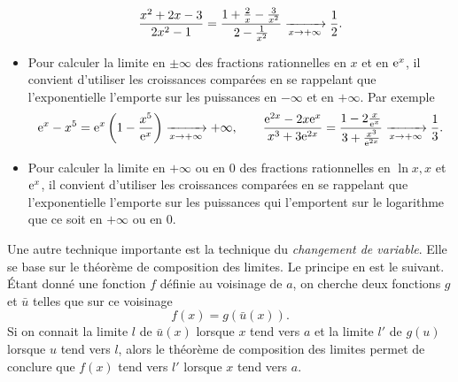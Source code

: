 \documentclass{magnolia}
\begin{document}
\begin{remarques}
\begin{itemize}
 $$\frac{x^2+2x-3}{2x^2-1}=\frac{1+\frac{2}{x}-\frac{3}{x^2}}
                           {2-\frac{1}{x^2}}\xrightarrow[x\rightarrow +\infty]{}\frac{1}{2}.$$
\item Pour calculer la limite en $\pm\infty$ des fractions rationnelles en $x$
  et en ${\rm e}^x$, il convient d'utiliser les croissances comparées en se
  rappelant que l'exponentielle l'emporte sur les puissances
  en $-\infty$ et en $+\infty$. Par exemple
  \[{\rm e}^x-x^5={\rm e}^x\left(1-\frac{x^5}{{\rm e}^x}\right)\xrightarrow[x\rightarrow +\infty]{} +\infty, \qquad
    \frac{{\rm e}^{2x}-2x{\rm e}^x}{x^3+3{\rm e}^{2x}}=\frac{1-2\frac{x}{{\rm e}^x}}
    {3+\frac{x^3}{{\rm e}^{2x}}}\xrightarrow[x\rightarrow +\infty]{}\frac{1}{3}.\]
\item Pour calculer la limite en $+\infty$ ou en $0$ des fractions rationnelles
  en $\ln x,x$ et ${\rm e}^x$, il convient d'utiliser les croissances comparées en se
  rappelant que l'exponentielle l'emporte sur les puissances
  qui l'emportent sur le logarithme que ce soit en $+\infty$ ou en $0$.
\end{itemize}
\remarque Une autre technique importante est la technique du \emph{changement de variable}. Elle
se base sur le théorème de composition des limites. Le principe en est le suivant.
Étant donné une fonction $f$ définie
au voisinage de $a$, on cherche deux fonctions $g$ et $\bar{u}$ telles que sur
ce voisinage
$$f(x)=g(\bar{u}(x)).$$
Si on connait la limite $l$ de $\bar{u}(x)$ lorsque $x$ tend vers $a$ et la
limite $l'$ de $g(u)$ lorsque $u$ tend vers $l$, alors le théorème de
composition des limites permet de conclure que $f(x)$ tend vers $l'$ lorsque $x$ tend vers $a$.
\end{remarques}








\end{document}
